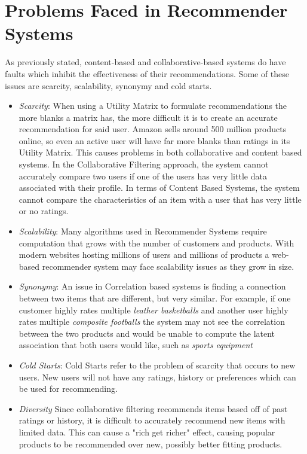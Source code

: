 \documentclass[11pt,reqno]{amsart}
\theoremstyle{definition}
\numberwithin{equation}{subsection}
\newcommand\tab[1][1cm]{\hspace*{#1}}
\begin{document}
\section{Problems Faced in Recommender Systems }

\tab As previously stated, content-based and collaborative-based systems do have faults which inhibit the effectiveness of their recommendations. Some of these issues are scarcity, scalability, synonymy and cold starts.

\begin{itemize}

\item \textit{Scarcity}: When using a Utility Matrix to formulate recommendations the more blanks a matrix has, the more difficult it is to create an accurate recommendation for said user.  Amazon sells around 500 million products online, so even an active user will have far more blanks than ratings in its Utility Matrix. This causes problems in both collaborative and content based systems. In the Collaborative Filtering approach, the system cannot accurately compare two users if one of the users has very little data associated with their profile. In terms of Content Based Systems, the system cannot compare the characteristics of an item with a user that has very little or no ratings. 

\item \textit{Scalability}: Many algorithms used in Recommender Systems require computation that grows with the number of customers and products.  With modern websites hosting millions of users and millions of products a web-based recommender system may face scalability issues as they grow in size.

\item \textit{Synonymy}: An issue in Correlation based systems is finding a connection between two items that are different, but very similar.  For example, if one customer highly rates multiple \textit{leather basketballs} and another user highly rates multiple \textit{composite footballs} the system may not see the correlation between the two products and would be unable to compute the latent association that both users would like, such as  \textit{sports equipment}

\item \textit{Cold Starts}: Cold Starts refer to the problem of scarcity that occurs to new users. New users will not have any ratings, history or preferences which can be used for recommending.  

\item \textit{Diversity} Since collaborative filtering recommends items based off of past ratings or history, it is difficult to accurately recommend new items with limited data. This can cause a "rich get richer" effect, causing popular products to be recommended over new, possibly better fitting products.

\end{itemize}
\end{document}
